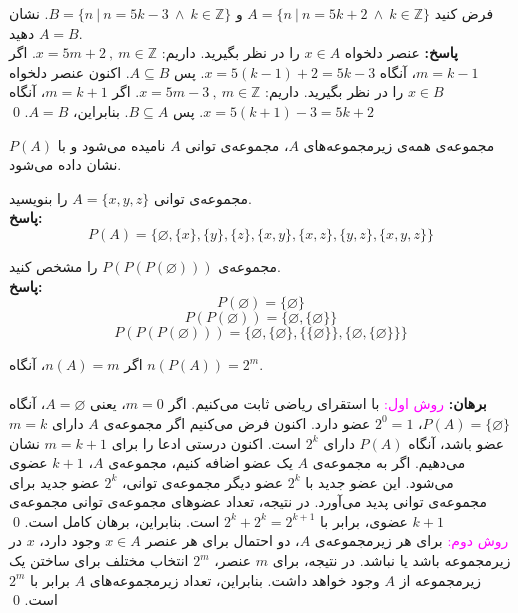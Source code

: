 \begin{example}
	فرض کنید
	$A = \{n \ | \ n=5k+2 \ \wedge \ k \in \mathbb{Z}\}$ و
	$B = \{n \ | \ n=5k-3 \ \wedge \ k \in \mathbb{Z}\}$.
	نشان دهید
	$A=B$.
	\\ \textbf{پاسخ:}
	عنصر دلخواه
	$x \in A$
	را در نظر بگیرید. داریم:
	$x = 5m+2 \ , \ m \in \mathbb{Z}$.
	اگر
	$m=k-1$،
	آنگاه
	$x = 5(k-1)+2 = 5k-3$.
	پس
	$A \subseteq B$.
	اکنون عنصر دلخواه
	$x \in B$
	را در نظر بگیرید. داریم:
	$x = 5m-3 \ , \ m \in \mathbb{Z}$.
	اگر
	$m=k+1$،
	آنگاه
	$x = 5(k+1)-3 = 5k+2$.
	پس
	$B \subseteq A$.
	بنابراین،
	$A=B$.
	\qed
\end{example}
\smallskip
مجموعه‌ی همه‌ی زیرمجموعه‌های $A$، مجموعه‌ی توانی $A$ نامیده می‌شود و با
$P(A)$
نشان داده می‌شود.
\begin{example}
	مجموعه‌ی توانی
	$A=\{x,y,z\}$
	را بنویسید.
	\\ \textbf{پاسخ:}
	$$P(A) = \{ \varnothing, \{x\}, \{y\}, \{z\}, \{x,y\}, \{x,z\}, \{y,z\}, \{x,y,z\} \}$$
\end{example}
\begin{example}
	مجموعه‌ی
	$P(P(P(\varnothing)))$
	را مشخص کنید.
	\\ \textbf{پاسخ:}
	$$P(\varnothing) = \{\varnothing\}$$
	$$P(P(\varnothing)) = \{\varnothing, \{\varnothing\}\}$$
	$$P(P(P(\varnothing))) = \{\varnothing, \{\varnothing\}, \{\{\varnothing\}\}, \{\varnothing, \{\varnothing\}\}\}$$
\end{example}
\begin{theorem}
	اگر 
	$n(A)=m$،
	آنگاه
	$n(P(A))=2^m$.
	\\ \dfth \\ \textbf{برهان:}
	\textcolor{magenta}{روش اول:}
	با استقرای ریاضی ثابت می‌کنیم.	اگر
	$m=0$،
	یعنی
	$A=\varnothing$،
	آنگاه
	$P(A)=\{\varnothing\}$،
	$2^0=1$
	عضو دارد. اکنون فرض می‌کنیم اگر مجموعه‌ی $A$ دارای
	$m=k$
	عضو باشد، آنگاه
	$P(A)$
	دارای
	$2^k$
	است. اکنون درستی ادعا را برای
	$m=k+1$
	نشان می‌دهیم. اگر به مجموعه‌ی $A$ یک عضو اضافه کنیم، مجموعه‌ی $A$،
	$k+1$
	عضوی می‌شود. این عضو جدید با
	$2^k$
	عضو دیگر مجموعه‌ی توانی،
	$2^k$
	عضو جدید برای مجموعه‌ی توانی پدید می‌آورد. در نتیجه، تعداد عضوهای مجموعه‌ی توانی مجموعه‌ی
	$k+1$
	عضوی، برابر با
	$2^k+2^k = 2^{k+1}$
	است. بنابراین، برهان کامل است.
	\qed \\
	\textcolor{magenta}{روش دوم:}
	برای هر زیرمجموعه‌ی $A$، دو احتمال برای هر عنصر
	$x \in A$
	وجود دارد، $x$ در زیرمجموعه باشد یا نباشد. در نتیجه، برای $m$ عنصر،
	$2^m$
	انتخاب مختلف برای ساختن یک زیرمجموعه از $A$ وجود خواهد داشت. بنابراین، تعداد زیرمجموعه‌های $A$ برابر با
	$2^m$
	است.
	\qed
\end{theorem}
